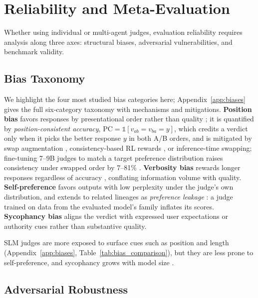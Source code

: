 \documentclass[11pt]{article}
\begin{document}
\section{Reliability and Meta-Evaluation}
\label{sec:reliability}

Whether using individual or multi-agent judges, evaluation reliability requires analysis along three axes: structural biases, adversarial vulnerabilities, and benchmark validity.

\subsection{Bias Taxonomy}

We highlight the four most studied bias categories here; Appendix~\ref{app:biases} gives the full six-category taxonomy with mechanisms and mitigations. \textbf{Position bias} favors responses by presentational order rather than quality \citep{zheng2023judging}; it is quantified by \emph{position-consistent accuracy}, $\text{PC} = \mathbb{1}[v_{ab}=v_{ba}=y]$, which credits a verdict only when it picks the better response $y$ in both A/B orders, and is mitigated by swap augmentation \citep{zhu2025judgelm}, consistency-based RL rewards \citep{whitehouse2025j1}, or inference-time swapping; fine-tuning 7--9B judges to match a target preference distribution raises consistency under swapped order by 7--81\% \citep{li2025judging}. \textbf{Verbosity bias} rewards longer responses regardless of accuracy \citep{chen2024humans, szymanski2025limitations}, conflating information volume with quality. \textbf{Self-preference} favors outputs with low perplexity under the judge's own distribution, and extends to related lineages as \emph{preference leakage} \citep{li2025preference}: a judge trained on data from the evaluated model's family inflates its scores. \textbf{Sycophancy bias} aligns the verdict with expressed user expectations or authority cues rather than substantive quality.

SLM judges are more exposed to surface cues such as position and length (Appendix~\ref{app:biases}, Table~\ref{tab:bias_comparison}), but they are less prone to self-preference, and sycophancy grows with model size \citep{perez2023discovering, wei2024simplesyntheticdatareduces}.

\subsection{Adversarial Robustness}
\end{document}
